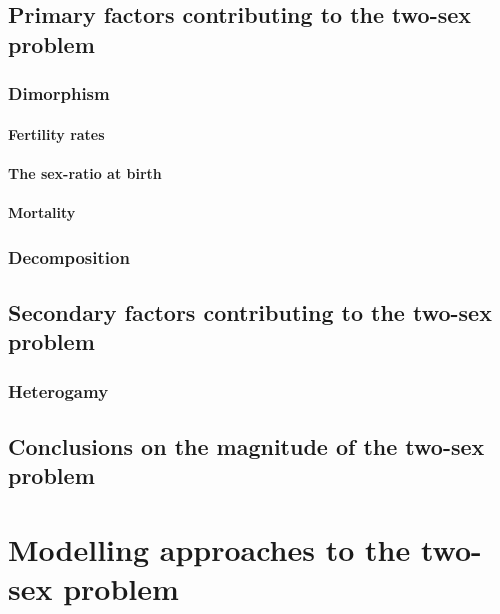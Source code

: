   \section{Primary factors contributing to the two-sex problem}
    \subsection{Dimorphism}
      
      \subsubsection{Fertility rates}
        
      \subsubsection{The sex-ratio at birth}
        
      \subsubsection{Mortality}
        
    \subsection{Decomposition}
       
  \section{Secondary factors contributing to the two-sex problem}
      
    \subsection{Heterogamy}
       
  \section{Conclusions on the magnitude of the two-sex problem}
      
  \chapter{Modelling approaches to the two-sex problem}
    
